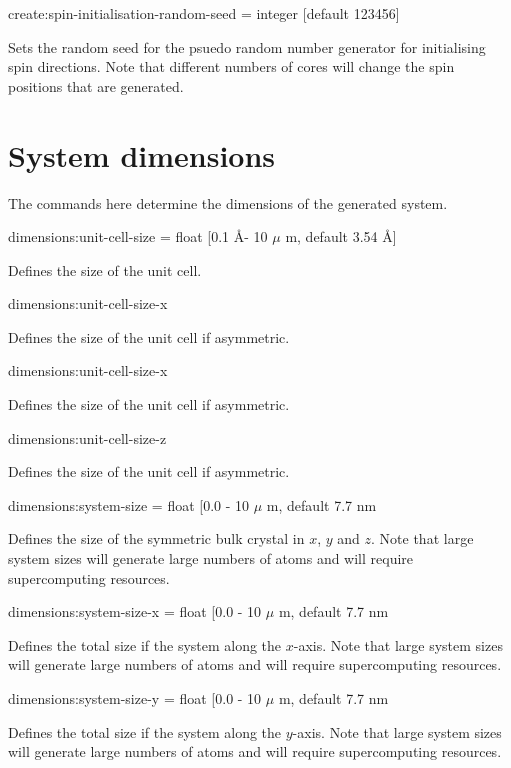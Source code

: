 {\zicf create:spin-initialisation-random-seed = integer [default 123456]}
Sets the random seed for the psuedo random number generator for initialising
spin directions. Note that different numbers of cores will change the
spin positions that are generated.\\

\section*{System dimensions} The commands here determine the dimensions of the generated system.

{\zicf dimensions:unit-cell-size = float [0.1 \AA - 10 $\mu$ m, default 3.54 \AA]} Defines the size of the unit cell.

{\zicf dimensions:unit-cell-size-x} Defines the size of the unit cell if asymmetric.

{\zicf dimensions:unit-cell-size-x} Defines the size of the unit cell if asymmetric.

{\zicf dimensions:unit-cell-size-z} Defines the size of the unit cell if asymmetric.

{\zicf dimensions:system-size = float [0.0 - 10 $\mu$ m, default 7.7 nm}
Defines the size of the symmetric bulk crystal in $x$, $y$ and $z$. Note that
large system sizes will generate large numbers of atoms and will require
supercomputing resources.

{\zicf dimensions:system-size-x = float [0.0 - 10 $\mu$ m, default 7.7 nm}
Defines the total size if the system along the $x$-axis. Note that
large system sizes will generate large numbers of atoms and will require
supercomputing resources.

{\zicf dimensions:system-size-y = float [0.0 - 10 $\mu$ m, default 7.7 nm}
Defines the total size if the system along the $y$-axis. Note that
large system sizes will generate large numbers of atoms and will require
supercomputing resources.

